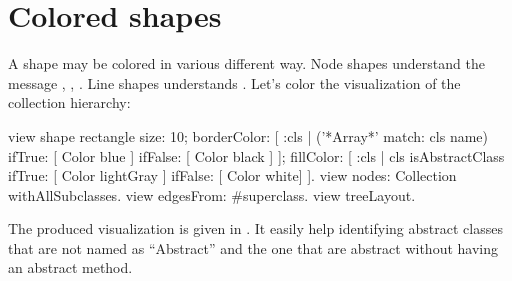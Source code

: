 \documentclass[a4paper,10pt,twoside]{book}
\begin{document}
%


%
%

\section{Colored shapes}

A shape may be colored in various different way. Node shapes understand the message , , . Line shapes understands . Let's color the visualization of the collection hierarchy:

\begin{code}{}
view shape rectangle
	size: 10;
	borderColor: [ :cls | ('*Array*' match: cls name) 
										ifTrue: [ Color blue ] 
										ifFalse: [ Color black ] ];
	fillColor: [ :cls | cls isAbstractClass ifTrue: [ Color lightGray ] ifFalse: [ Color white] ].
view nodes: Collection withAllSubclasses.
view edgesFrom: #superclass.
view treeLayout.
\end{code}

The produced visualization is given in . It easily help identifying abstract classes that are not named as ``Abstract'' and the one that are abstract without having an abstract method.
\end{document}
